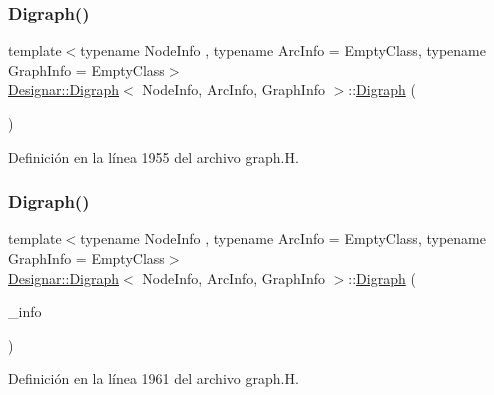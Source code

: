 \subsubsection{\texorpdfstring{Digraph()}{Digraph()}\hspace{0.1cm}{\footnotesize\ttfamily [1/5]}}
{\footnotesize\ttfamily template$<$typename Node\+Info , typename Arc\+Info  = Empty\+Class, typename Graph\+Info  = Empty\+Class$>$ \\
\hyperlink{class_designar_1_1_digraph}{Designar\+::\+Digraph}$<$ Node\+Info, Arc\+Info, Graph\+Info $>$\+::\hyperlink{class_designar_1_1_digraph}{Digraph} (\begin{DoxyParamCaption}{ }\end{DoxyParamCaption})\hspace{0.3cm}{\ttfamily [inline]}}



Definición en la línea 1955 del archivo graph.\+H.

\mbox{\label{class_designar_1_1_digraph_ae5210934b3e6e64caceffee62ff1fcad}} 
\subsubsection{\texorpdfstring{Digraph()}{Digraph()}\hspace{0.1cm}{\footnotesize\ttfamily [2/5]}}
{\footnotesize\ttfamily template$<$typename Node\+Info , typename Arc\+Info  = Empty\+Class, typename Graph\+Info  = Empty\+Class$>$ \\
\hyperlink{class_designar_1_1_digraph}{Designar\+::\+Digraph}$<$ Node\+Info, Arc\+Info, Graph\+Info $>$\+::\hyperlink{class_designar_1_1_digraph}{Digraph} (\begin{DoxyParamCaption}\item[{const Graph\+Info \&}]{\+\_\+info }\end{DoxyParamCaption})\hspace{0.3cm}{\ttfamily [inline]}}



Definición en la línea 1961 del archivo graph.\+H.

\mbox{\label{class_designar_1_1_digraph_a534b12da4e0aeb32cff655f05e6c91a4}} 
